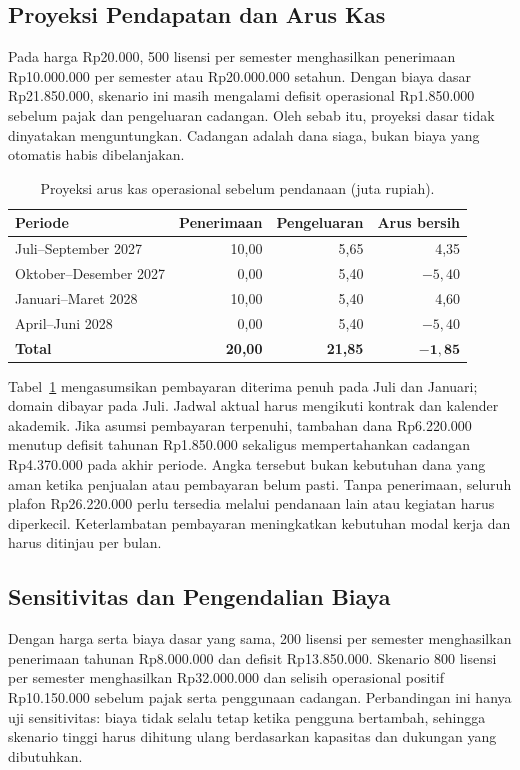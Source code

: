 \documentclass[12pt,a4paper,oneside]{report}
\begin{document}
\subsection{Proyeksi Pendapatan dan Arus Kas}
Pada harga Rp20.000, 500 lisensi per semester menghasilkan penerimaan Rp10.000.000 per semester atau Rp20.000.000 setahun. Dengan biaya dasar Rp21.850.000, skenario ini masih mengalami defisit operasional Rp1.850.000 sebelum pajak dan pengeluaran cadangan. Oleh sebab itu, proyeksi dasar tidak dinyatakan menguntungkan. Cadangan adalah dana siaga, bukan biaya yang otomatis habis dibelanjakan.

\begin{table}[!htbp]
\centering\singlespacing
\caption{Proyeksi arus kas operasional sebelum pendanaan (juta rupiah).}
\label{tab:aruskas}
\begin{tabularx}{\textwidth}{@{}>{\raggedright\arraybackslash}X r r r@{}}
\toprule
\textbf{Periode} & \textbf{Penerimaan} & \textbf{Pengeluaran} & \textbf{Arus bersih} \tabularnewline
\midrule
Juli--September 2027 & 10,00 & 5,65 & 4,35 \tabularnewline
Oktober--Desember 2027 & 0,00 & 5,40 & $-5,40$ \tabularnewline
Januari--Maret 2028 & 10,00 & 5,40 & 4,60 \tabularnewline
April--Juni 2028 & 0,00 & 5,40 & $-5,40$ \tabularnewline
\midrule
\textbf{Total} & \textbf{20,00} & \textbf{21,85} & $\mathbf{-1,85}$ \tabularnewline
\bottomrule
\end{tabularx}
\end{table}
\FloatBarrier

Tabel~\ref{tab:aruskas} mengasumsikan pembayaran diterima penuh pada Juli dan Januari; domain dibayar pada Juli. Jadwal aktual harus mengikuti kontrak dan kalender akademik. Jika asumsi pembayaran terpenuhi, tambahan dana Rp6.220.000 menutup defisit tahunan Rp1.850.000 sekaligus mempertahankan cadangan Rp4.370.000 pada akhir periode. Angka tersebut bukan kebutuhan dana yang aman ketika penjualan atau pembayaran belum pasti. Tanpa penerimaan, seluruh plafon Rp26.220.000 perlu tersedia melalui pendanaan lain atau kegiatan harus diperkecil. Keterlambatan pembayaran meningkatkan kebutuhan modal kerja dan harus ditinjau per bulan.

\subsection{Sensitivitas dan Pengendalian Biaya}
Dengan harga serta biaya dasar yang sama, 200 lisensi per semester menghasilkan penerimaan tahunan Rp8.000.000 dan defisit Rp13.850.000. Skenario 800 lisensi per semester menghasilkan Rp32.000.000 dan selisih operasional positif Rp10.150.000 sebelum pajak serta penggunaan cadangan. Perbandingan ini hanya uji sensitivitas: biaya tidak selalu tetap ketika pengguna bertambah, sehingga skenario tinggi harus dihitung ulang berdasarkan kapasitas dan dukungan yang dibutuhkan.
\end{document}
